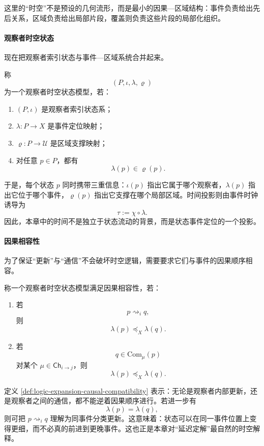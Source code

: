 这里的“时空”不是预设的几何流形，而是最小的因果—区域结构：事件负责给出先后关系，区域负责给出局部片段，覆盖则负责这些片段的局部化组织。

\paragraph{观察者时空状态}
现在把观察者索引状态与事件—区域系统合并起来。

\begin{definition}[观察者时空状态模型]\label{def:logic-expansion-observer-spacetime-state-model}
称
\[
(P,\iota,\lambda,\varrho)
\]
为一个观察者时空状态模型，若：
\begin{enumerate}
  \item \((P,\iota)\) 是观察者索引状态系；
  \item \(\lambda:P\to X\) 是事件定位映射；
  \item \(\varrho:P\to \mathcal U\) 是区域支撑映射；
  \item 对任意 \(p\in P\)，都有
  \[
  \lambda(p)\in \varrho(p).
  \]
\end{enumerate}
\end{definition}

于是，每个状态 \(p\) 同时携带三重信息：\(\iota(p)\) 指出它属于哪个观察者，\(\lambda(p)\) 指出它位于哪个事件，\(\varrho(p)\) 指出它支撑在哪个局部区域。时间投影则由事件时钟诱导为
\[
\tau:=\chi\circ \lambda.
\]
因此，本章中的时间不是独立于状态流动的背景，而是状态事件定位的一个投影。

\paragraph{因果相容性}
为了保证“更新”与“通信”不会破坏时空逻辑，需要要求它们与事件的因果顺序相容。

\begin{definition}[因果相容性]\label{def:logic-expansion-causal-compatibility}
称一个观察者时空状态模型满足因果相容性，若：
\begin{enumerate}
  \item 若
  \[
  p\rightsquigarrow_i q,
  \]
  则
  \[
  \lambda(p)\preceq_X \lambda(q).
  \]
  \item 若
  \[
  q\in \mathrm{Com}_\mu(p)
  \]
  对某个 \(\mu\in \mathsf{Ch}_{i\to j}\)，则
  \[
  \lambda(p)\preceq_X \lambda(q).
  \]
\end{enumerate}
\end{definition}

定义 \ref{def:logic-expansion-causal-compatibility} 表示：无论是观察者内部更新，还是观察者之间的通信，都不能逆着因果顺序进行。若进一步有
\[
\lambda(p)=\lambda(q),
\]
则可把 \(p\rightsquigarrow_i q\) 理解为同事件分类更新。这意味着：状态可以在同一事件位置上变得更细，而不必真的前进到更晚事件。这也正是本章对“延迟定解”最自然的时空解释。

